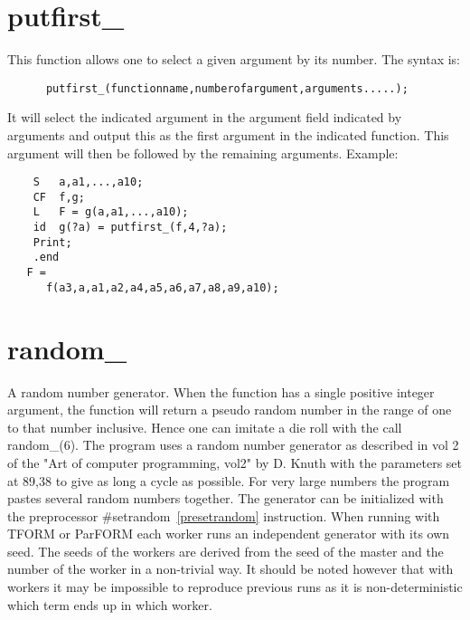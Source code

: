 
\section{putfirst\_}
\label{funputfirst}

\noindent 
This function allows one to select a given argument by its number. The 
syntax is:
\begin{verbatim}
      putfirst_(functionname,numberofargument,arguments.....);
\end{verbatim}
It will select the indicated argument in the argument field indicated by 
arguments and output this as the first argument in the indicated function. 
This argument will then be followed by the remaining arguments.
Example:
\begin{verbatim}
    S   a,a1,...,a10;
    CF  f,g;
    L   F = g(a,a1,...,a10);
    id  g(?a) = putfirst_(f,4,?a);
    Print;
    .end
   F =
      f(a3,a,a1,a2,a4,a5,a6,a7,a8,a9,a10);
\end{verbatim}


\section{random\_}
\label{funrandom}
\noindent A random number generator. When the function has a single 
positive integer argument, the function will return a pseudo random number 
in the range of one to that number inclusive. Hence one can imitate a die 
roll with the call random\_(6). The program uses a random number generator 
as described in vol 2 of the "Art of computer programming, vol2" by D. 
Knuth with the parameters set at 89,38 to give as long a cycle as possible. 
For very large numbers the program pastes several random numbers together. 
The generator can be initialized with the preprocessor 
\#setrandom~\ref{presetrandom} instruction. When running 
with TFORM or ParFORM each worker runs an independent generator with its 
own seed. The seeds of the workers are derived from the seed of the master 
and the number of the worker in a non-trivial way. It should be noted 
however that with workers it may be impossible to reproduce previous runs 
as it is non-deterministic which term ends up in which worker.


